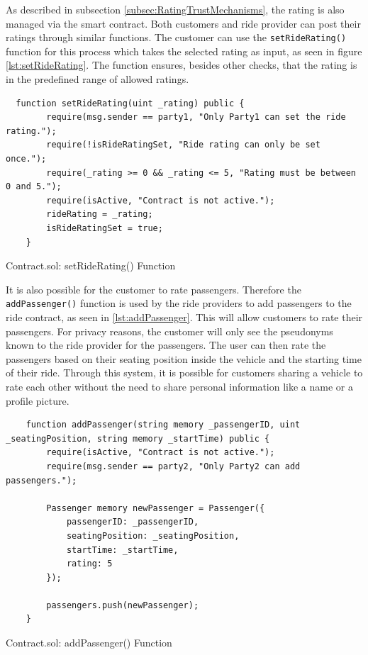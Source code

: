 As described in subsection \ref{subsec:RatingTrustMechanisms}, the rating is also managed via the smart contract. Both customers and ride provider can post their ratings through similar functions. The customer can use the \texttt{setRideRating()} function for this process which takes the selected rating as input, as seen in figure \ref{lst:setRideRating}.
The function ensures, besides other checks, that the rating is in the predefined range of allowed ratings. 

\lstset{
  basicstyle=\footnotesize\ttfamily,
  breaklines=true,
  numbers=left,
  firstnumber=222
}
\begin{Listing}
\begin{lstlisting}
  function setRideRating(uint _rating) public {
        require(msg.sender == party1, "Only Party1 can set the ride rating.");
        require(!isRideRatingSet, "Ride rating can only be set once.");
        require(_rating >= 0 && _rating <= 5, "Rating must be between 0 and 5.");
        require(isActive, "Contract is not active.");
        rideRating = _rating;
        isRideRatingSet = true;
    }
\end{lstlisting}
  \caption{Contract.sol: setRideRating() Function}
  \label{lst:setRideRating}
\end{Listing}

It is also possible for the customer to rate passengers. Therefore the \texttt{addPassenger()} function is used by the ride providers to add passengers to the ride contract, as seen in \ref{lst:addPassenger}. This will allow customers to rate their passengers. For privacy reasons, the customer will only see the pseudonyms known to the ride provider for the passengers. The user can then rate the passengers based on their seating position inside the vehicle and the starting time of their ride. Through this system, it is possible for customers sharing a vehicle to rate each other without the need to share personal information like a name or a profile picture. 

\lstset{
  basicstyle=\footnotesize\ttfamily,
  breaklines=true,
  numbers=left,
  firstnumber=53
}

\begin{Listing}
\begin{lstlisting}
    function addPassenger(string memory _passengerID, uint _seatingPosition, string memory _startTime) public {
        require(isActive, "Contract is not active.");
        require(msg.sender == party2, "Only Party2 can add passengers.");

        Passenger memory newPassenger = Passenger({
            passengerID: _passengerID,
            seatingPosition: _seatingPosition,
            startTime: _startTime,
            rating: 5
        });

        passengers.push(newPassenger);
    }
\end{lstlisting}
  \caption{Contract.sol: addPassenger() Function}
  \label{lst:addPassenger}
\end{Listing}


